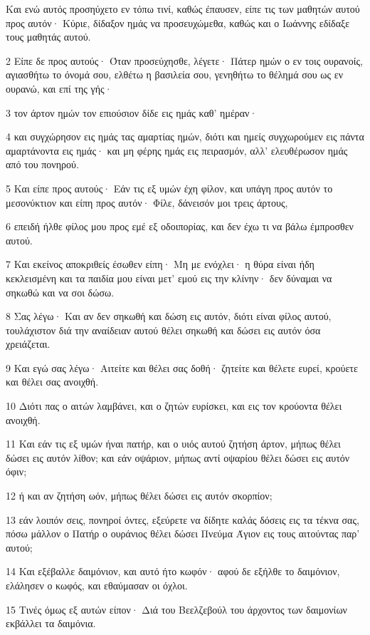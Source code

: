 \par Και ενώ αυτός προσηύχετο εν τόπω τινί, καθώς έπαυσεν, είπε τις των μαθητών αυτού προς αυτόν· Κύριε, δίδαξον ημάς να προσευχώμεθα, καθώς και ο Ιωάννης εδίδαξε τους μαθητάς αυτού.
\par 2 Είπε δε προς αυτούς· Όταν προσεύχησθε, λέγετε· Πάτερ ημών ο εν τοις ουρανοίς, αγιασθήτω το όνομά σου, ελθέτω η βασιλεία σου, γενηθήτω το θέλημά σου ως εν ουρανώ, και επί της γής·
\par 3 τον άρτον ημών τον επιούσιον δίδε εις ημάς καθ' ημέραν·
\par 4 και συγχώρησον εις ημάς τας αμαρτίας ημών, διότι και ημείς συγχωρούμεν εις πάντα αμαρτάνοντα εις ημάς· και μη φέρης ημάς εις πειρασμόν, αλλ' ελευθέρωσον ημάς από του πονηρού.
\par 5 Και είπε προς αυτούς· Εάν τις εξ υμών έχη φίλον, και υπάγη προς αυτόν το μεσονύκτιον και είπη προς αυτόν· Φίλε, δάνεισόν μοι τρεις άρτους,
\par 6 επειδή ήλθε φίλος μου προς εμέ εξ οδοιπορίας, και δεν έχω τι να βάλω έμπροσθεν αυτού.
\par 7 Και εκείνος αποκριθείς έσωθεν είπη· Μη με ενόχλει· η θύρα είναι ήδη κεκλεισμένη και τα παιδία μου είναι μετ' εμού εις την κλίνην· δεν δύναμαι να σηκωθώ και να σοι δώσω.
\par 8 Σας λέγω· Και αν δεν σηκωθή και δώση εις αυτόν, διότι είναι φίλος αυτού, τουλάχιστον διά την αναίδειαν αυτού θέλει σηκωθή και δώσει εις αυτόν όσα χρειάζεται.
\par 9 Και εγώ σας λέγω· Αιτείτε και θέλει σας δοθή· ζητείτε και θέλετε ευρεί, κρούετε και θέλει σας ανοιχθή.
\par 10 Διότι πας ο αιτών λαμβάνει, και ο ζητών ευρίσκει, και εις τον κρούοντα θέλει ανοιχθή.
\par 11 Και εάν τις εξ υμών ήναι πατήρ, και ο υιός αυτού ζητήση άρτον, μήπως θέλει δώσει εις αυτόν λίθον; και εάν οψάριον, μήπως αντί οψαρίου θέλει δώσει εις αυτόν όφιν;
\par 12 ή και αν ζητήση ωόν, μήπως θέλει δώσει εις αυτόν σκορπίον;
\par 13 εάν λοιπόν σεις, πονηροί όντες, εξεύρετε να δίδητε καλάς δόσεις εις τα τέκνα σας, πόσω μάλλον ο Πατήρ ο ουράνιος θέλει δώσει Πνεύμα Άγιον εις τους αιτούντας παρ' αυτού;
\par 14 Και εξέβαλλε δαιμόνιον, και αυτό ήτο κωφόν· αφού δε εξήλθε το δαιμόνιον, ελάλησεν ο κωφός, και εθαύμασαν οι όχλοι.
\par 15 Τινές όμως εξ αυτών είπον· Διά του Βεελζεβούλ του άρχοντος των δαιμονίων εκβάλλει τα δαιμόνια.
